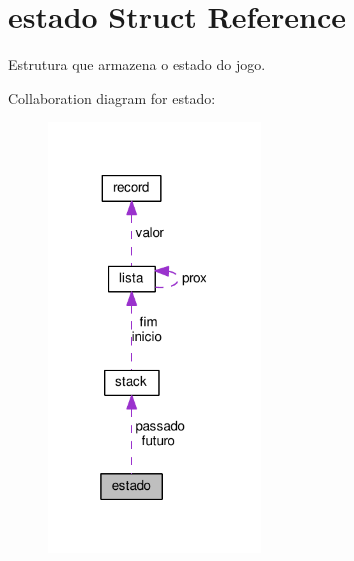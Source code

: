 \hypertarget{structestado}{\section{estado Struct Reference}
\label{structestado}
}


Estrutura que armazena o estado do jogo.  




Collaboration diagram for estado\+:
\nopagebreak
\begin{figure}[H]
\begin{center}
\leavevmode
\includegraphics[width=160pt]{structestado__coll__graph}
\end{center}
\end{figure}
